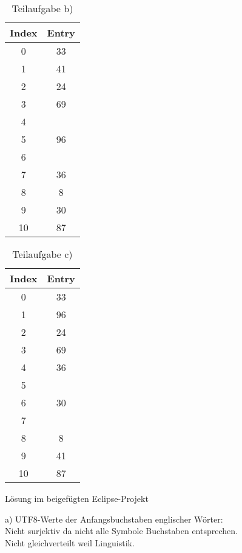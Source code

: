 \documentclass[12pt]{scrartcl}
\begin{document}
\begin{table}[h!]
\begin{center}
\begin{tabular}{|c|c|}
\hline
Index & Entry\\
\hline
\hline
0 & 33\\
\hline
1 & 41\\
\hline
2 & 24 \\
\hline
3 & 69\\
\hline
4 & \\
\hline
5 & 96\\
\hline
6 & \\
\hline
7 & 36\\
\hline
8 & 8\\
\hline
9 & 30\\
\hline
10 & 87\\
\hline
\end{tabular}
\caption{Teilaufgabe b)}
\end{center}
\end{table}

\begin{table}[h!]
\begin{center}
\begin{tabular}{|c|c|}
\hline
Index & Entry\\
\hline
\hline
0 & 33\\
\hline
1 & 96\\
\hline
2 & 24 \\
\hline
3 & 69\\
\hline
4 & 36\\
\hline
5 & \\
\hline
6 & 30\\
\hline
7 & \\
\hline
8 & 8\\
\hline
9 & 41\\
\hline
10 & 87\\
\hline
\end{tabular}
\caption{Teilaufgabe c)}
\end{center}
\end{table}
\newpage

\exercise{}
Lösung im beigefügten Eclipse-Projekt

\exercise{}
a) UTF8-Werte der Anfangsbuchstaben englischer Wörter:\\
Nicht surjektiv da nicht alle Symbole Buchstaben entsprechen.\\
Nicht gleichverteilt weil Linguistik.\\
\end{document}
